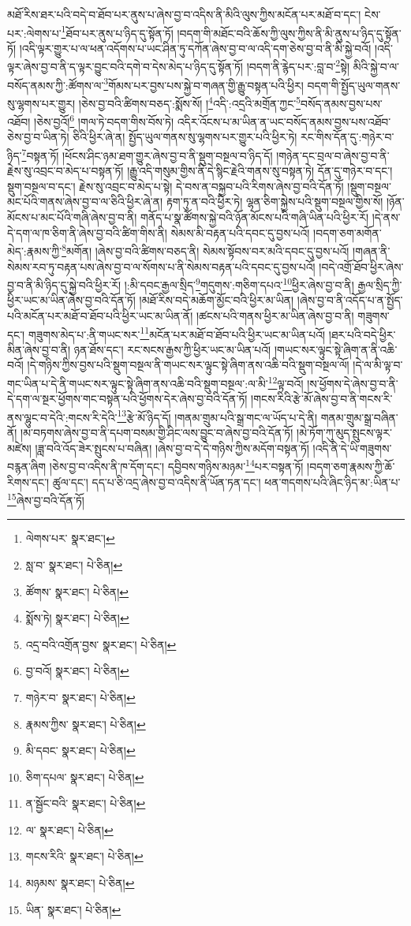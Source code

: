 མཐོ་རིས་ཐར་པའི་བདེ་བ་ཐོབ་པར་ནུས་པ་ཞེས་བྱ་བ་འདིས་ནི་མིའི་ལུས་ཀྱིས་མངོན་པར་མཐོ་བ་དང་། ངེས་པར་:ལེགས་པ་\footnote{ལེགས་པར་  སྣར་ཐང་། }ཐོབ་པར་ནུས་པ་ཉིད་དུ་སྟོན་ཏོ། །བདག་གི་མཐོང་བའི་ཆོས་ཀྱི་ལུས་ཀྱིས་ནི་མི་ནུས་པ་ཉིད་དུ་སྟོན་ཏོ། །འདི་ལྟར་གྱུར་པ་ལ་ཕན་འདོགས་པ་ཡང་ཤིན་ཏུ་དཀོན་ཞེས་བྱ་བ་ལ་འདི་དག་ཅེས་བྱ་བ་ནི་མི་སྐྱེ་བའོ། །འདི་ལྟར་ཞེས་བྱ་བ་ནི་ད་ལྟར་བྱུང་བའི་དགེ་བ་དེས་མེད་པ་ཉིད་དུ་སྟོན་ཏོ། །བདག་ནི་རྙེད་པར་:བླ་བ་\footnote{སླ་བ་  སྣར་ཐང་།  པེ་ཅིན། }སྟེ། མིའི་སྐྱེ་བ་ལ་བསོད་ནམས་ཀྱི་:ཚོགས་ལ་\footnote{ཚོགས་  སྣར་ཐང་།  པེ་ཅིན། }གོམས་པར་བྱས་པས་སྐྱེ་བ་གཞན་གྱི་རྒྱུ་བསྟན་པའི་ཕྱིར། བདག་གི་སྤྱོད་ཡུལ་གནས་སུ་ལྷགས་པར་གྱུར། །ཅེས་བྱ་བའི་ཚིགས་བཅད་:སྨོས་སོ། །\footnote{སྨོས་ཏེ།   སྣར་ཐང་།  པེ་ཅིན། }འདི་:འདྲའི་མགྲོན་ཀྱང་\footnote{འདྲ་བའི་འགྲོན་བྱས་  སྣར་ཐང་།  པེ་ཅིན། }བསོད་ནམས་བྱས་པས་འཐོབ། །ཅེས་བྱའོ།\footnote{བྱ་བའོ།  སྣར་ཐང་།  པེ་ཅིན། } །གལ་ཏེ་བདག་གིས་བོས་ཏེ། འདིར་འོངས་པ་མ་ཡིན་ན་ཡང་བསོད་ནམས་བྱས་པས་འཐོབ་ཅེས་བྱ་བ་ཡིན་ཏེ། ཅིའི་ཕྱིར་ཞེ་ན། སྤྱོད་ཡུལ་གནས་སུ་ལྷགས་པར་གྱུར་པའི་ཕྱིར་ཏེ། རང་གིས་དོན་དུ་:གཉེར་བ་ཉིད་\footnote{གཉེར་བ་  སྣར་ཐང་།  པེ་ཅིན། }བསྟན་ཏོ། །ཕོངས་ཤིང་ཉམ་ཐག་གྱུར་ཞེས་བྱ་བ་ནི་སྡུག་བསྔལ་བ་ཉིད་དོ། །གཉེན་དང་བྲལ་བ་ཞེས་བྱ་བ་ནི་རྗེས་སུ་འབྲང་བ་མེད་པ་བསྟན་ཏོ། །རྒྱུ་འདི་གསུམ་གྱིས་ནི་དེ་སྙིང་རྗེའི་གནས་སུ་བསྟན་ཏེ། དོན་དུ་གཉེར་བ་དང་། སྡུག་བསྔལ་བ་དང་། རྗེས་སུ་འབྲང་བ་མེད་པ་སྟེ། དེ་བས་ན་བསྐྱབ་པའི་རིགས་ཞེས་བྱ་བའི་དོན་ཏོ། །སྡུག་བསྔལ་མང་པོའི་གནས་ཞེས་བྱ་བ་ལ་ཅིའི་ཕྱིར་ཞེ་ན། རྟག་ཏུ་ན་བའི་ཕྱིར་ཏེ། ལྷན་ཅིག་སྐྱེས་པའི་སྡུག་བསྔལ་གྱིས་སོ། །ཉོན་མོངས་པ་མང་པོའི་གཞི་ཞེས་བྱ་བ་ནི། གནོད་པ་སྣ་ཚོགས་སྐྱེ་བའི་ཉོན་མོངས་པའི་གཞི་ཡིན་པའི་ཕྱིར་རོ། །དེ་ནས་དེ་དག་ལ་ཁ་ཅིག་ནི་ཞེས་བྱ་བའི་ཚིག་གིས་ནི། སེམས་མི་བརྟན་པའི་དབང་དུ་བྱས་པའོ། །བདག་ཅག་མགོན་མེད་:རྣམས་ཀྱི་\footnote{རྣམས་ཀྱིས་  སྣར་ཐང་།  པེ་ཅིན། }མགོན། །ཞེས་བྱ་བའི་ཚིགས་བཅད་ནི། སེམས་སྟོབས་བར་མའི་དབང་དུ་བྱས་པའོ། །གཞན་ནི་སེམས་རབ་ཏུ་བརྟན་པས་ཞེས་བྱ་བ་ལ་སོགས་པ་ནི་སེམས་བརྟན་པའི་དབང་དུ་བྱས་པའོ། །བདེ་འགྲོ་ཐོབ་ཕྱིར་ཞེས་བྱ་བ་ནི་མི་ཉིད་དུ་སྐྱེ་བའི་ཕྱིར་རོ། །:མི་དབང་རྒྱལ་སྲིད་\footnote{མི་དབང་  སྣར་ཐང་།  པེ་ཅིན། }གདུགས་:གཅིག་དཔའ་\footnote{ཅིག་དཔལ་  སྣར་ཐང་།  པེ་ཅིན། }ཕྱིར་ཞེས་བྱ་བ་ནི། རྒྱལ་སྲིད་ཀྱི་ཕྱིར་ཡང་མ་ཡིན་ཞེས་བྱ་བའི་དོན་ཏོ། །མཐོ་རིས་བདེ་མཆོག་མྱོང་བའི་ཕྱིར་མ་ཡིན། །ཞེས་བྱ་བ་ནི་འདོད་པ་ན་སྤྱོད་པའི་མངོན་པར་མཐོ་བ་ཐོབ་པའི་ཕྱིར་ཡང་མ་ཡིན་ནོ། །ཚངས་པའི་གནས་ཕྱིར་མ་ཡིན་ཞེས་བྱ་བ་ནི། གཟུགས་དང་། གཟུགས་མེད་པ་:ནི་གཡང་སར་\footnote{ན་སྦྱོང་བའི་  སྣར་ཐང་།  པེ་ཅིན། }མངོན་པར་མཐོ་བ་ཐོབ་པའི་ཕྱིར་ཡང་མ་ཡིན་པའོ། །ཐར་པའི་བདེ་ཕྱིར་མིན་ཞེས་བྱ་བ་ནི། ཉན་ཐོས་དང་། རང་སངས་རྒྱས་ཀྱི་ཕྱིར་ཡང་མ་ཡིན་པའོ། །གཡང་སར་ལྟུང་སྟེ་ཞིག་ན་ནི་འཆི་བའོ། །དེ་གཉིས་ཀྱིས་བྱས་པའི་སྡུག་བསྔལ་ནི་གཡང་སར་ལྟུང་སྟེ་ཞིག་ནས་འཆི་བའི་སྡུག་བསྔལ་ལོ། །དེ་ལ་མི་ལྟ་བ་གང་ཡིན་པ་དེ་ནི་གཡང་སར་ལྟུང་སྟེ་ཞིག་ནས་འཆི་བའི་སྡུག་བསྔལ་:ལ་མི་\footnote{ལ་  སྣར་ཐང་།  པེ་ཅིན། }ལྟ་བའོ། །ས་ཕྱོགས་དེ་ཞེས་བྱ་བ་ནི་དེ་དག་ལ་སྔར་ཕྱོགས་གང་བསྟན་པའི་ཕྱོགས་དེར་ཞེས་བྱ་བའི་དོན་ཏོ། །གངས་རིའི་རྩེ་མོ་ཞེས་བྱ་བ་ནི་གངས་རི་ནས་ལྷུང་བ་དེའི་:གངས་རི་དེའི་\footnote{གངས་རིའི་  སྣར་ཐང་།  པེ་ཅིན། }རྩེ་མོ་ཉིད་དོ། །གནམ་གྲུམ་པའི་སྒྲ་གང་ལ་ཡོད་པ་དེ་ནི། གནམ་གྲུམ་སྒྲ་བཞིན་ནོ། །མ་བཏགས་ཞེས་བྱ་བ་ནི་དཔག་བསམ་གྱི་ཤིང་ལས་བྱུང་བ་ཞེས་བྱ་བའི་དོན་ཏོ། །མེ་ཏོག་ཀུ་མུད་སྤུངས་ལྟར་མཛེས། །ཟླ་བའི་འོད་ཟེར་སྤུངས་པ་བཞིན། །ཞེས་བྱ་བ་དེ་དེ་གཉིས་ཀྱིས་མདོག་བསྟན་ཏོ། །འདི་ནི་དེ་ཡི་གཟུགས་བརྙན་ཞིག །ཅེས་བྱ་བ་འདིས་ནི་ཁ་དོག་དང་། དབྱིབས་གཉིས་མཉམ་\footnote{མཉམས་  སྣར་ཐང་།  པེ་ཅིན། }པར་བསྟན་ཏོ། །བདག་ཅག་རྣམས་ཀྱི་ཆོ་རིགས་དང་། ཚུལ་དང་། དད་པ་ཅི་འདྲ་ཞེས་བྱ་བ་འདིས་ནི་ཡོན་ཏན་དང་། ཕན་གདགས་པའི་ཞིང་ཉིད་མ་:ཡིན་པ་\footnote{ཡིན་  སྣར་ཐང་།  པེ་ཅིན། }ཞེས་བྱ་བའི་དོན་ཏོ། 